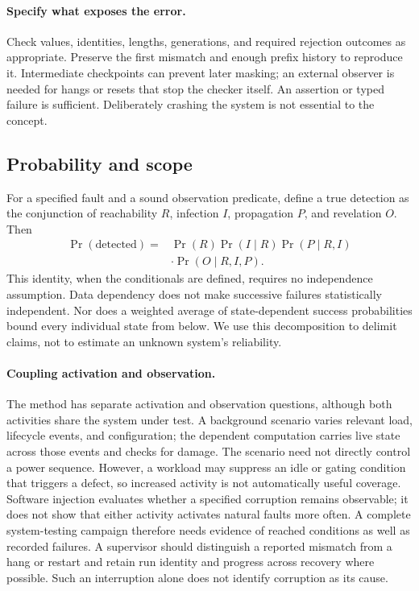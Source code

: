 \documentclass[10pt,twocolumn,letterpaper]{article}
\begin{document}
\paragraph{Specify what exposes the error.}
Check values, identities, lengths, generations, and required rejection outcomes as appropriate. Preserve the first mismatch and enough prefix history to reproduce it. Intermediate checkpoints can prevent later masking; an external observer is needed for hangs or resets that stop the checker itself. An assertion or typed failure is sufficient. Deliberately crashing the system is not essential to the concept.

\subsection{Probability and scope}
For a specified fault and a sound observation predicate, define a true detection as the conjunction of reachability $R$, infection $I$, propagation $P$, and revelation $O$. Then
\begin{align}
\Pr(\mathrm{detected})={}&\Pr(R)\Pr(I\mid R)\Pr(P\mid R,I)\nonumber\\
 &\cdot\Pr(O\mid R,I,P).
\end{align}
This identity, when the conditionals are defined, requires no independence assumption. Data dependency does not make successive failures statistically independent. Nor does a weighted average of state-dependent success probabilities bound every individual state from below. We use this decomposition to delimit claims, not to estimate an unknown system's reliability.

\paragraph{Coupling activation and observation.}
The method has separate activation and observation questions, although both activities share the system under test. A background scenario varies relevant load, lifecycle events, and configuration; the dependent computation carries live state across those events and checks for damage. The scenario need not directly control a power sequence. However, a workload may suppress an idle or gating condition that triggers a defect, so increased activity is not automatically useful coverage. Software injection evaluates whether a specified corruption remains observable; it does not show that either activity activates natural faults more often. A complete system-testing campaign therefore needs evidence of reached conditions as well as recorded failures. A supervisor should distinguish a reported mismatch from a hang or restart and retain run identity and progress across recovery where possible. Such an interruption alone does not identify corruption as its cause.
\end{document}
